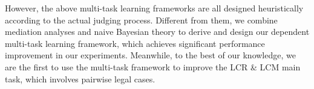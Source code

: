 However, the above multi-task learning frameworks are all designed heuristically according to the actual judging process.
Different from them, we combine mediation analyses and naive Bayesian theory to derive and design our dependent multi-task learning framework, which achieves significant performance improvement in our experiments.
Meanwhile, to the best of our knowledge, we are the first to use the multi-task framework to improve the LCR \& LCM main task, which involves pairwise legal cases.